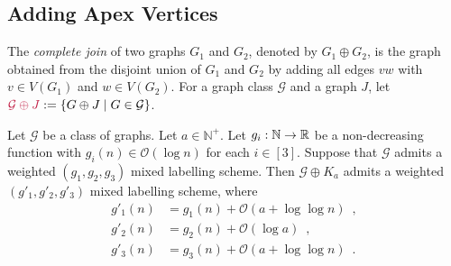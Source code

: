 \documentclass{patmorin}
\makeatletter
\renewcommand{\le}{\leqslant}
\newcommand{\defin}[1]{\emph{\textcolor{brightmaroon}{#1}}}
\def\mathcolor#1#{\@mathcolor{#1}}
\def\@mathcolor#1#2#3{%
  \protect\leavevmode
  \begingroup
    \color#1{#2}#3%
  \endgroup
}
\newcommand{\mathdefin}[1]{\mathcolor{brightmaroon}{#1}}
\newcommand{\NN}{\mathbb{N}}
\newcommand{\Oh}{\mathcal{O}}
\makeatother
\begin{document}

\subsection{Adding Apex Vertices}

  The \defin{complete join} of two graphs $G_1$ and $G_2$, denoted by \defin{${G_1\oplus G_2}$}, is the graph obtained from the disjoint union of $G_1$ and $G_2$ by adding all edges $vw$ with $v\in V(G_1)$ and $w\in V(G_2)$.
  For a graph class $\mathcal{G}$ and a graph $J$,
  let $\mathdefin{\mathcal{G}\oplus J}:=\{G\oplus J\mid  G\in\mathcal{G}\}$.%

  \begin{lem}\label{add_apexes}
    Let $\mathcal{G}$ be a class of graphs.
    Let $a\in\NN^+$. Let $g_i:\mathbb{N}\to\mathbb{R}$ be a non-decreasing function  with $g_i(n)\in \Oh(\log n)$ for each $i\in[3]$.
    Suppose that $\mathcal{G}$ admits a weighted $(g_1,g_2,g_3)$ mixed labelling scheme.
    Then $\mathcal{G}\oplus K_a$ admits a weighted $(g'_1,g'_2,g'_3)$ mixed labelling scheme, where
    \begin{align*}
        g'_1(n) & = g_1(n)+\Oh(a+\log\log n) \enspace,\\
        g'_2(n) & = g_2(n)+\Oh(\log a) \enspace,\\
        g'_3(n) & = g_3(n)+\Oh(a+\log\log n) \enspace .
    \end{align*}
  \end{lem}
\end{document}
